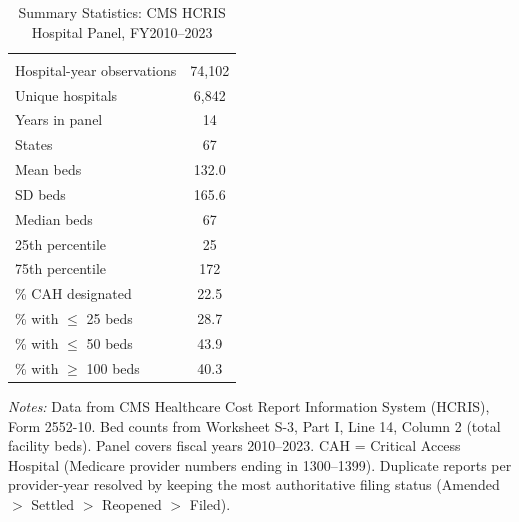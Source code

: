\begin{table}[htbp]
\centering
\caption{Summary Statistics: CMS HCRIS Hospital Panel, FY2010--2023}
\label{tab:summary}
\begin{tabular}{lc}
\hline\hline
 & \\
Hospital-year observations & 74,102 \\
Unique hospitals & 6,842 \\
Years in panel & 14 \\
States & 67 \\
Mean beds & 132.0 \\
SD beds & 165.6 \\
Median beds & 67 \\
25th percentile & 25 \\
75th percentile & 172 \\
\% CAH designated & 22.5 \\
\% with $\leq$ 25 beds & 28.7 \\
\% with $\leq$ 50 beds & 43.9 \\
\% with $\geq$ 100 beds & 40.3 \\
\hline\hline
\end{tabular}
\begin{tablenotes}
\small
\item \textit{Notes:} Data from CMS Healthcare Cost Report Information System (HCRIS), Form 2552-10. Bed counts from Worksheet S-3, Part I, Line 14, Column 2 (total facility beds). Panel covers fiscal years 2010--2023. CAH = Critical Access Hospital (Medicare provider numbers ending in 1300--1399). Duplicate reports per provider-year resolved by keeping the most authoritative filing status (Amended $>$ Settled $>$ Reopened $>$ Filed).
\end{tablenotes}
\end{table}

